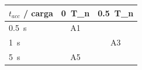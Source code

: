 \begin{tabular}{lcc}
\toprule
$t_{acc}$ / carga & 0~T_n & 0.5~T_n \\
\midrule
0.5~s & A1 &  \\
1~s &  & A3 \\
5~s & A5 &  \\
\bottomrule
\end{tabular}
